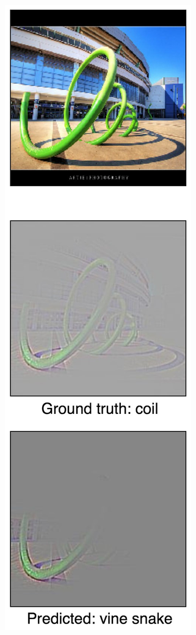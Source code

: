 \begin{figure}[ht!]
\begin{center}
\begin{subfigure}[b]{0.23\linewidth}
        \caption{}
        \label{fig:failure_syringe}
    \end{subfigure}
    \begin{subfigure}[b]{0.23\linewidth}
        \centering
        \includegraphics[width=1\linewidth]{figures/failure_78.jpg}

\end{subfigure}
\end{center}
\end{figure}
